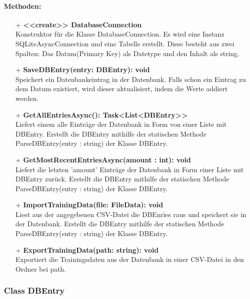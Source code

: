\documentclass[a4paper,12pt]{article}
\begin{document}
	\paragraph{Methoden:}
	\begin{itemize}
		\item[+] \textbf{<<create>> DatabaseConnection}\\Konstruktor für die Klasse DatabaseConnection. Es wird eine Instanz SQLiteAsyncConnection und eine Tabelle erstellt. Diese besteht aus zwei Spalten: Das Datum(Primary Key) als Datetype und den Inhalt als string.
		\item[+] \textbf{SaveDBEntry(entry: DBEntry): void}\\Speichert ein Datenbankeintrag in der \gls{Datenbank}. Falls schon ein Eintrag zu dem Datum existiert, wird dieser aktualisiert, indem die Werte addiert werden.\\
		\item[+] \textbf{GetAllEntriesAsync(): Task<List<DBEntry>>}\\Liefert einem alle Einträge der Datenbank in Form von einer Liste mit DBEntry. Erstellt die DBEntry mithilfe der statischen Methode ParseDBEntry(entry : string) der Klasse DBEntry.\\ 
		\item[+] \textbf{GetMostRecentEntriesAsync(amount : int): void}\\Liefert  die letzten 'amount' Einträge der Datenbank in Form einer Liste mit DBEntry zurück. Erstellt die DBEntry mithilfe der statischen Methode ParseDBEntry(entry : string) der Klasse DBEntry.\\
		\item[+] \textbf{ImportTrainingData(file: FileData): void}\\Liest aus der angegebenen \gls{CSV}-Datei die DBEnries raus und speichert sie in der \gls{Datenbank}. Erstellt die DBEntry mithilfe der statischen Methode ParseDBEntry(entry : string) der Klasse DBEntry.\\

		\item[+] \textbf{ExportTrainingData(path: string): void}\\Exportiert die Trainingsdaten aus der \gls{Datenbank} in einer \gls{CSV}-Datei in den Ordner bei path. \\
	\end{itemize}
\begin{minipage}[b]{0.6\textwidth}
	\subsubsection{Class DBEntry}
\end{minipage}
\end{document}

